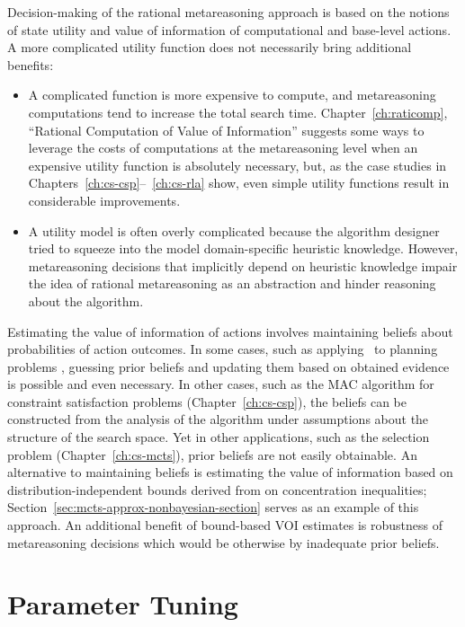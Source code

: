 Decision-making of the rational metareasoning approach is based on the
notions of state utility and value of information of computational and
base-level actions. A more complicated utility function does not necessarily
bring additional  benefits:
\begin{itemize}
\item A complicated function is more expensive to compute, and
  metareasoning computations tend to increase the total search
  time.  Chapter~\ref{ch:raticomp}, ``Rational Computation of Value of
  Information'' suggests some ways to leverage the costs of
  computations at the metareasoning level when an expensive utility
  function is absolutely necessary, but, as the case studies in
  Chapters~\ref{ch:cs-csp}--~\ref{ch:cs-rla} show, even simple utility
  functions result in considerable improvements.
\item A utility model is often overly complicated because the
  algorithm designer tried to squeeze into the model domain-specific
  heuristic knowledge. However, metareasoning decisions
  that implicitly depend on heuristic knowledge impair the idea of
  rational metareasoning as an abstraction and hinder reasoning about
  the algorithm.
\end{itemize}

Estimating the value of information of actions involves maintaining
beliefs about probabilities of action outcomes. In some cases, such as
applying \rationallazyastar~to planning problems
\cite{TolpinEtAl.rla}, guessing prior beliefs and updating them based
on obtained evidence is possible and even necessary. In other cases,
such as the MAC algorithm for constraint satisfaction problems
(Chapter~\ref{ch:cs-csp}), the beliefs can be constructed from the
analysis of the algorithm under assumptions about the structure of the
search space. Yet in other applications, such as the selection problem
(Chapter~\ref{ch:cs-mcts}), prior beliefs are not easily obtainable. An
alternative to maintaining beliefs is estimating the value of
information based on distribution-independent bounds derived from on
concentration inequalities;
Section~\ref{sec:mcts-approx-nonbayesian-section} serves as an example  
of this approach. An additional benefit of bound-based VOI estimates 
is robustness of metareasoning decisions which would be otherwise
by inadequate prior beliefs. 

\section{Parameter Tuning}

